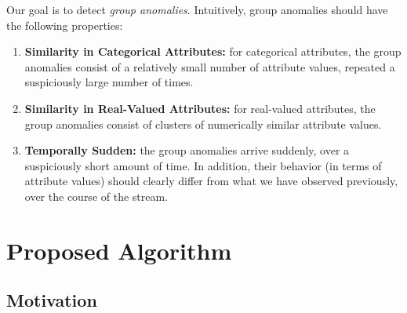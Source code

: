 \documentclass[sigconf]{acmart}
\begin{document}
Our goal is to detect \emph{group anomalies}. Intuitively, group anomalies should have the following properties:

\begin{enumerate}
    \item {\bf Similarity in Categorical Attributes:} for categorical attributes, the group anomalies consist of a relatively small number of attribute values, repeated a suspiciously large number of times.
    \item {\bf Similarity in Real-Valued Attributes:} for real-valued attributes, the group anomalies consist of clusters of numerically similar attribute values.
    \item {\bf Temporally Sudden:} the group anomalies arrive suddenly, over a suspiciously short amount of time. In addition, their behavior (in terms of attribute values) should clearly differ from what we have observed previously, over the course of the stream.
\end{enumerate} \section{Proposed Algorithm}

\subsection{Motivation}
\end{document}
